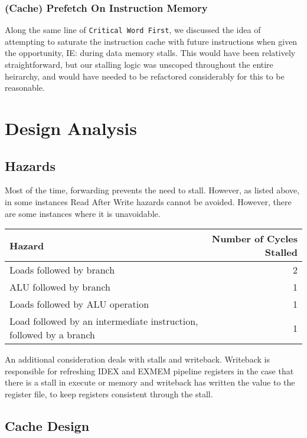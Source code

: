 \documentclass[11pt]{article}
\begin{document}
\subsubsection{(Cache) Prefetch On Instruction Memory}
\label{sec:orgc78f4bd}
Along the same line of \texttt{Critical Word First}, we discussed the
idea of attempting to saturate the instruction cache with future
instructions when given the opportunity, IE: during data memory
stalls. This would have been relatively straightforward, but our
stalling logic was unscoped throughout the entire heirarchy, and
would have needed to be refactored considerably for this to be
reasonable.


\pagebreak

\section{Design Analysis}
\label{sec:org550b511}

\subsection{Hazards}
\label{sec:org2dd0edc}

Most of the time, forwarding prevents the need to stall. However, as
listed above, in some instances Read After Write hazards cannot be
avoided. However, there are some instances where it is unavoidable.


\begin{center}
\begin{tabular}{lr}
Hazard & Number of Cycles Stalled\\
\hline
Loads followed by branch & 2\\
ALU followed by branch & 1\\
Loads followed by ALU operation & 1\\
Load followed by an intermediate instruction, followed by a branch & 1\\
\end{tabular}
\end{center}

An additional consideration deals with stalls and writeback. Writeback
is responsible for refreshing IDEX and EXMEM pipeline registers in the
case that there is a stall in execute or memory and writeback has
written the value to the register file, to keep registers consistent
through the stall.

\subsection{Cache Design}
\label{sec:org1918758}
\end{document}
